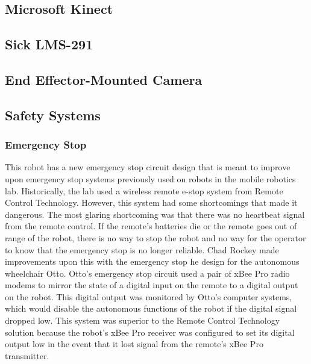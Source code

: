\documentclass{article}
\begin{document}
\subsection[Microsoft Kinect]{Microsoft Kinect}
\subsection[Sick LMS{}-291]{Sick LMS-291}
\subsection[End Effector{}-Mounted Camera]{End Effector-Mounted Camera}
\subsection[Safety Systems]{Safety Systems}
\subsubsection[Emergency Stop]{Emergency Stop}
This robot has a new emergency stop circuit design that is meant to improve upon emergency stop systems previously used on robots in the mobile robotics lab. Historically, the lab used a wireless remote e-stop system from Remote Control Technology. However, this system had some shortcomings that made it dangerous. The most glaring shortcoming was that there was no heartbeat signal from the remote control. If the remote{\textquoteright}s batteries die or the remote goes out of range of the robot, there is no way to stop the robot and no way for the operator to know that the emergency stop is no longer reliable. Chad Rockey made improvements upon this with the emergency stop he design for the autonomous wheelchair Otto. Otto{\textquoteright}s emergency stop circuit used a pair of xBee Pro radio modems to mirror the state of a digital input on the remote to a digital output on the robot. This digital output was monitored by Otto{\textquoteright}s computer systems, which would disable the autonomous functions of the robot if the digital signal dropped low. This system was superior to the Remote Control Technology solution because the robot{\textquoteright}s xBee Pro receiver was configured to set its digital output low in the event that it lost signal from the remote{\textquoteright}s xBee Pro transmitter.
\end{document}

